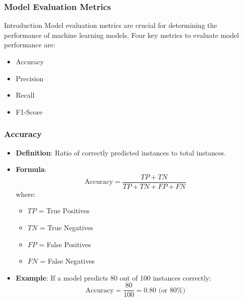\documentclass[aspectratio=169]{beamer}
\begin{document}
\begin{frame}[fragile]
    \frametitle{Model Evaluation Metrics}
    \begin{block}{Introduction}
        Model evaluation metrics are crucial for determining the performance of machine learning models. 
        Four key metrics to evaluate model performance are:
        \begin{itemize}
            \item Accuracy
            \item Precision
            \item Recall
            \item F1-Score
        \end{itemize}
    \end{block}
\end{frame}

\begin{frame}[fragile]
    \frametitle{Accuracy}
    \begin{itemize}
        \item \textbf{Definition}: Ratio of correctly predicted instances to total instances.
        \item \textbf{Formula}: 
        \begin{equation}
        \text{Accuracy} = \frac{TP + TN}{TP + TN + FP + FN}
        \end{equation}
        where:
        \begin{itemize}
            \item \(TP\) = True Positives
            \item \(TN\) = True Negatives
            \item \(FP\) = False Positives
            \item \(FN\) = False Negatives
        \end{itemize}
        \item \textbf{Example}: 
        If a model predicts 80 out of 100 instances correctly:
        \begin{equation}
        \text{Accuracy} = \frac{80}{100} = 0.80 \text{ (or 80\%)} 
        \end{equation}
    \end{itemize}
\end{frame}
\end{document}
